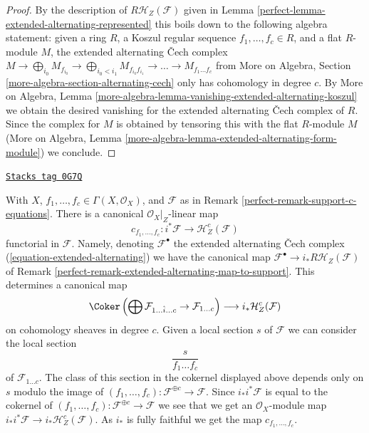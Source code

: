 \begin{proof}

By the description of $R\mathcal{H}_Z(\mathcal{F})$ given in
Lemma \ref{perfect-lemma-extended-alternating-represented} this boils
down to the following algebra statement: given a ring $R$,
a Koszul regular sequence $f_1, \ldots, f_c \in R$, and a flat
$R$-module $M$, the extended alternating {\v C}ech complex
$M \to \bigoplus\nolimits_{i_0} M_{f_{i_0}} \to
\bigoplus\nolimits_{i_0 < i_1} M_{f_{i_0}f_{i_1}} \to
\ldots \to M_{f_1 \ldots f_c}$
from More on Algebra, Section \ref{more-algebra-section-alternating-cech}
only has cohomology in degree $c$. By More on Algebra, Lemma
\ref{more-algebra-lemma-vanishing-extended-alternating-koszul}
we obtain the desired vanishing for the extended alternating
{\v C}ech complex of $R$. Since the complex for $M$ is obtained
by tensoring this with the flat $R$-module $M$
(More on Algebra, Lemma
\ref{more-algebra-lemma-extended-alternating-form-module})
we conclude.
\end{proof}

\begin{remark}
\label{perfect-remark-supported-map-c-equations}
\href{https://stacks.math.columbia.edu/tag/0G7Q}{\texttt{Stacks tag 0G7Q}}

With $X$, $f_1, \ldots, f_c \in \Gamma(X, \mathcal{O}_X)$, and
$\mathcal{F}$ as in Remark \ref{perfect-remark-support-c-equations}.
There is a canonical $\mathcal{O}_X|_Z$-linear map
$$
c_{f_1, \ldots, f_c} :
i^*\mathcal{F}
\longrightarrow
\mathcal{H}^c_Z(\mathcal{F})
$$
functorial in $\mathcal{F}$. Namely, denoting $\mathcal{F}^\bullet$ the
extended alternating {\v C}ech complex (\ref{equation-extended-alternating})
we have the canonical map
$\mathcal{F}^\bullet \to i_*R\mathcal{H}_Z(\mathcal{F})$
of Remark \ref{perfect-remark-extended-alternating-map-to-support}.
This determines a canonical map
$$
\Coker\left(\bigoplus \mathcal{F}_{1 \ldots \hat i \ldots c} \to
\mathcal{F}_{1 \ldots c}\right)
\longrightarrow
i_*\mathcal{H}^c_Z(\mathcal{F})
$$
on cohomology sheaves in degree $c$.
Given a local section $s$ of $\mathcal{F}$ we can consider the
local section
$$
\frac{s}{f_1 \ldots f_c}
$$
of $\mathcal{F}_{1 \ldots c}$. The class of this section in the cokernel
displayed above depends only on $s$ modulo the image of
$(f_1, \ldots, f_c) : \mathcal{F}^{\oplus c} \to \mathcal{F}$.
Since $i_*i^*\mathcal{F}$ is equal to the cokernel of
$(f_1, \ldots, f_c) : \mathcal{F}^{\oplus c} \to \mathcal{F}$
we see that we get an $\mathcal{O}_X$-module map
$i_*i^*\mathcal{F} \to i_*\mathcal{H}_Z^c(\mathcal{F})$.
As $i_*$ is fully faithful we get the map $c_{f_1, \ldots, f_c}$.
\end{remark}

